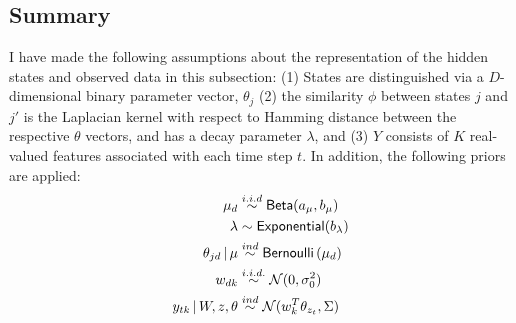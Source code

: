 \subsection{Summary}
\label{sec:summary}

I have made the following assumptions about the representation of the
hidden states and observed data in this subsection:
(1) States are distinguished via a $D$-dimensional binary parameter vector, $\theta_j$ 
(2) the similarity $\phi$ between states $j$ and $j'$
is the Laplacian kernel with respect to Hamming distance 
between the respective $\theta$ vectors, and has a decay parameter 
$\lambda$, and (3) $Y$ consists of $K$ real-valued
features associated with each time step $t$.  In addition, the following priors are applied:
\begin{align}
\mu_d &\stackrel{i.i.d}{\sim} \mathsf{Beta}(a_{\mu},b_{\mu}) \\
\lambda &\sim \mathsf{Exponential}(b_{\lambda}) \\
\theta_{jd} \, \vert \, \mu &\stackrel{ind}{\sim} \mathsf{Bernoulli}\left(\mu_d\right) \\
w_{dk} &\stackrel{i.i.d.}{\sim} \mathcal{N}(0,\sigma^2_0) \\
y_{tk} \, \vert \, W, z, \theta &\stackrel{ind}{\sim} \mathcal{N}(w_{k}^{T}\theta_{z_t},\Sigma)
\end{align}


